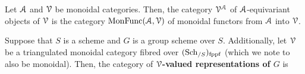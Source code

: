             \begin{definition} \label{def: equivariant_monoidal_categories}
                Let $\mathcal{A}$ and $\mathcal{V}$ be monoidal categories. Then, the category $\mathcal{V}^{\mathcal{A}}$ of $\mathcal{A}$-equivariant objects of $\mathcal{V}$ is the category $\mathrm{Mon}\mathrm{Func}(\mathcal{A}, \mathcal{V})$ of monoidal functors from $\mathcal{A}$ into $\mathcal{V}$.
            \end{definition}
            \begin{definition} \label{def: linear_representations_of_group_schemes}
                Suppose that $S$ is a scheme and $G$ is a group scheme over $S$. Additionally, let $\mathcal{V}$ be a triangulated monoidal category fibred over $(\mathrm{Sch}_{/S})_{\mathrm{fppf}}$ (which we note to also be monoidal). Then, the category of \textbf{$\mathcal{V}$-valued representations of $G$} is 
            \end{definition}
